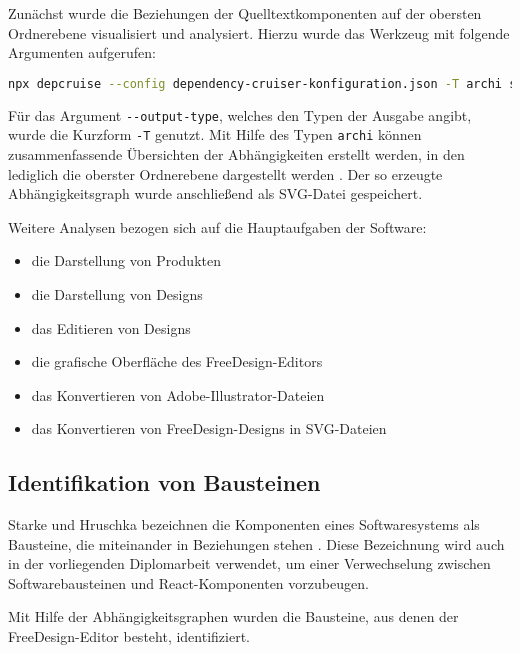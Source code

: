 Zunächst wurde die Beziehungen der Quelltextkomponenten auf der obersten Ordnerebene visualisiert und analysiert. 
Hierzu wurde das Werkzeug mit folgende Argumenten aufgerufen:

\begin{lstlisting}[language={sh}, label=depcruise-overview, caption=Kommando zur Erzeugung der Visualisierungen der obersten Ordnerebene]
npx depcruise --config dependency-cruiser-konfiguration.json -T archi src | dot -T svg > Projektuebersicht.svg
\end{lstlisting}

Für das Argument \lstinline|--output-type|, welches den Typen der Ausgabe angibt, wurde die Kurzform  \lstinline|-T| genutzt. Mit Hilfe des Typen \lstinline|archi| können zusammenfassende Übersichten der Abhängigkeiten erstellt werden, in den lediglich die oberster Ordnerebene dargestellt werden \autocite[vgl.][]{Verweij:Options}.
Der so erzeugte Abhängigkeitsgraph wurde anschließend als SVG-Datei gespeichert. 

Weitere Analysen bezogen sich auf die Hauptaufgaben der Software:
\begin{itemize}
    \item die Darstellung von Produkten
    \item die Darstellung von Designs
    \item das Editieren von Designs
    \item die grafische Oberfläche des FreeDesign-Editors
    \item das Konvertieren von Adobe-Illustrator-Dateien
    \item das Konvertieren von FreeDesign-Designs in SVG-Dateien
\end{itemize}



\subsection{Identifikation von Bausteinen}
Starke und Hruschka bezeichnen die Komponenten eines Softwaresystems als Bausteine, die miteinander in Beziehungen stehen \autocite[vgl.][24]{Starke2011}. Diese Bezeichnung wird auch in der vorliegenden Diplomarbeit verwendet, um einer Verwechselung zwischen Softwarebausteinen und React-Komponenten vorzubeugen.

Mit Hilfe der Abhängigkeitsgraphen wurden die Bausteine, aus denen der FreeDesign-Editor besteht, identifiziert. 

